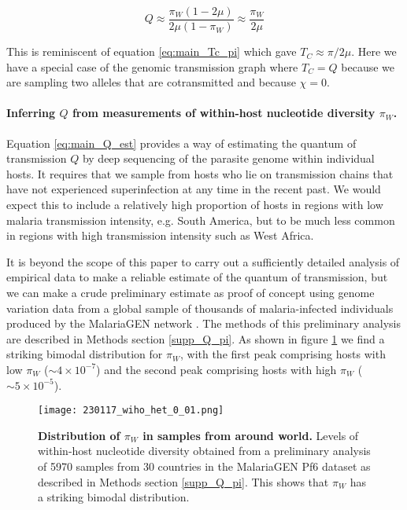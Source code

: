 \documentclass[_main.tex]{subfiles}
\begin{document}
\begin{equation}
Q 
\approx \frac{ \pi_W ( 1 - 2 \mu) }{ 2 \mu ( 1 - \pi_W ) }
\approx \frac{ \pi_W }{ 2 \mu }
\label{eq:main_Q_est}
\end{equation}

This is reminiscent of equation \ref{eq:main_Tc_pi} which gave $T_C \approx \pi / 2\mu$.  Here we have a special case of the genomic transmission graph where $T_C = Q$ because we are sampling two alleles that are cotransmitted and because $\chi=0$. 

\paragraph{Inferring $Q$ from measurements of within-host nucleotide diversity $\pi_W$.}  Equation \ref{eq:main_Q_est} provides a way of estimating the quantum of transmission $Q$ by deep sequencing of the parasite genome within individual hosts.  It requires that we sample from hosts who lie on transmission chains that have not experienced superinfection at any time in the recent past.  We would expect this to include a relatively high proportion of hosts in regions with low malaria transmission intensity, e.g. South America, but to be much less common in regions with high transmission intensity such as West Africa.

It is beyond the scope of this paper to carry out a sufficiently detailed analysis of empirical data to make a reliable estimate of the quantum of transmission, but we can make a crude preliminary estimate as proof of concept using genome variation data from a global sample of thousands of malaria-infected individuals produced by the MalariaGEN network \cite{MalariaGEN2021}.  The methods of this preliminary analysis are described in Methods section \ref{supp_Q_pi}.  As shown in figure \ref{fig:main_pi_w_distribution} we find a striking bimodal distribution for $\pi_W$, with the first peak comprising hosts with low $\pi_W$ ($\sim 4 \times 10^{-7}$) and the second peak comprising hosts with high $\pi_W$ ($\sim 5 \times 10^{-5}$).

\begin{figure}[h!]
\centering
\texttt{[image: 230117\_wiho\_het\_0\_01.png]}
\caption{
\textbf{Distribution of $\pi_W$ in samples from around world.}  Levels of within-host nucleotide diversity obtained from a preliminary analysis of 5970 samples from 30 countries in the MalariaGEN Pf6 dataset \cite{MalariaGEN2021} as described in Methods section \ref{supp_Q_pi}.  This shows that $\pi_W$ has a striking bimodal distribution.
}
\label{fig:main_pi_w_distribution}
\end{figure}
\end{document}
